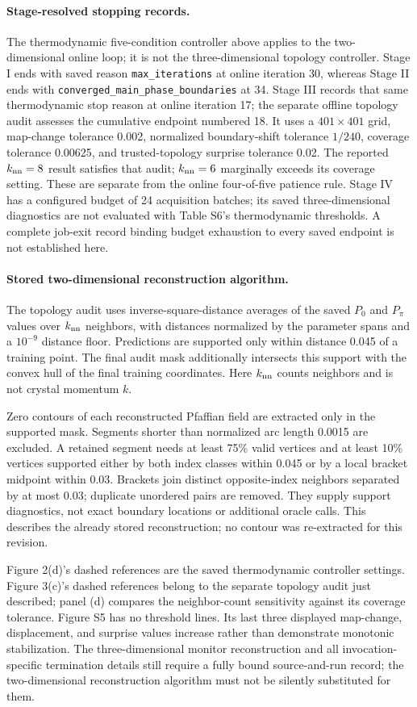 \paragraph{Stage-resolved stopping records.}
The thermodynamic five-condition controller above applies to the two-dimensional online loop; it is not the three-dimensional topology controller. Stage I ends with saved reason \texttt{max\_iterations} at online iteration 30, whereas Stage II ends with \texttt{converged\_main\_phase\_boundaries} at 34. Stage III records that same thermodynamic stop reason at online iteration 17; the separate offline topology audit assesses the cumulative endpoint numbered 18. It uses a $401\times401$ grid, map-change tolerance 0.002, normalized boundary-shift tolerance $1/240$, coverage tolerance 0.00625, and trusted-topology surprise tolerance 0.02. The reported $k_{\rm nn}=8$ result satisfies that audit; $k_{\rm nn}=6$ marginally exceeds its coverage setting. These are separate from the online four-of-five patience rule. Stage IV has a configured budget of 24 acquisition batches; its saved three-dimensional diagnostics are not evaluated with Table S6's thermodynamic thresholds. A complete job-exit record binding budget exhaustion to every saved endpoint is not established here.

\paragraph{Stored two-dimensional reconstruction algorithm.}
The topology audit uses inverse-square-distance averages of the saved $P_0$ and $P_\pi$ values over $k_{\rm nn}$ neighbors, with distances normalized by the parameter spans and a $10^{-9}$ distance floor. Predictions are supported only within distance 0.045 of a training point. The final audit mask additionally intersects this support with the convex hull of the final training coordinates. Here $k_{\rm nn}$ counts neighbors and is not crystal momentum $k$.

Zero contours of each reconstructed Pfaffian field are extracted only in the supported mask. Segments shorter than normalized arc length 0.0015 are excluded. A retained segment needs at least 75\% valid vertices and at least 10\% vertices supported either by both index classes within 0.045 or by a local bracket midpoint within 0.03. Brackets join distinct opposite-index neighbors separated by at most 0.03; duplicate unordered pairs are removed. They supply support diagnostics, not exact boundary locations or additional oracle calls. This describes the already stored reconstruction; no contour was re-extracted for this revision.

Figure 2(d)'s dashed references are the saved thermodynamic controller settings. Figure 3(c)'s dashed references belong to the separate topology audit just described; panel (d) compares the neighbor-count sensitivity against its coverage tolerance. Figure S5 has no threshold lines. Its last three displayed map-change, displacement, and surprise values increase rather than demonstrate monotonic stabilization. The three-dimensional monitor reconstruction and all invocation-specific termination details still require a fully bound source-and-run record; the two-dimensional reconstruction algorithm must not be silently substituted for them.

